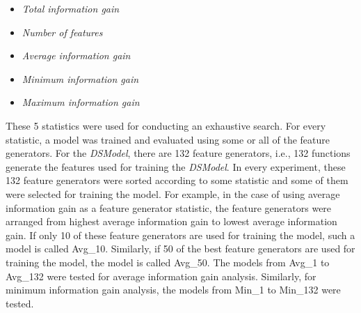 \begin{itemize}

\item \textit{Total information gain}

\item \textit{Number of features}

\item \textit{Average information gain}

\item \textit{Minimum information gain}

\item \textit{Maximum information gain}

\end{itemize}


These 5 statistics were used for conducting an exhaustive search. For every statistic, a model was trained and evaluated using some or all of the feature generators. For the \textit{DSModel}, there are 132 feature generators, i.e., 132 functions generate the features used for training the \textit{DSModel}. In every experiment, these 132 feature generators were sorted according to some statistic and some of them were selected for training the model. For example, in the case of using average information gain as a feature generator statistic, the feature generators were arranged from highest average information gain to lowest average information gain. If only 10 of these feature generators are used for training the model, such a model is called Avg\_10. Similarly, if 50 of the best feature generators are used for training the model, the model is called Avg\_50. The models from Avg\_1 to Avg\_132 were tested for average information gain analysis. Similarly, for minimum information gain analysis, the models from Min\_1 to Min\_132 were tested.

